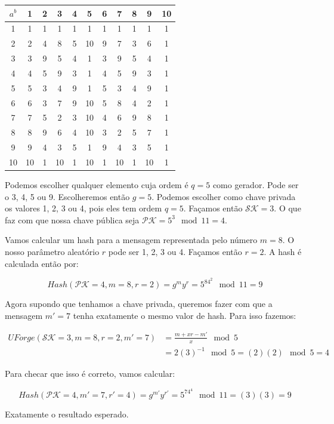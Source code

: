 \documentclass[a4paper]{article}
\begin{document}
 \begin{tabular}{|c||c|c|c|c|c|c|c|c|c|c|}
 \hline
 $a^b$&1&2&3&4&5&6&7&8&9&10\\
 \hline
 \hline
 1&1&1&1&1&1&1&1&1&1&1\\
 \hline
 2&2&4&8&5&10&9&7&3&6&1\\
 \hline
 3&3&9&5&4&1&3&9&5&4&1\\
 \hline
 4&4&5&9&3&1&4&5&9&3&1\\
 \hline
 5&5&3&4&9&1&5&3&4&9&1\\
 \hline
 6&6&3&7&9&10&5&8&4&2&1\\
 \hline
 7&7&5&2&3&10&4&6&9&8&1\\
 \hline
 8&8&9&6&4&10&3&2&5&7&1\\
 \hline
 9&9&4&3&5&1&9&4&3&5&1\\
 \hline
 10&10&1&10&1&10&1&10&1&10&1\\
 \hline
 \end{tabular}
 
 Podemos escolher qualquer elemento cuja ordem é $q=5$ como
 gerador. Pode ser o 3, 4, 5 ou 9. Escolheremos então $g=5$. Podemos
 escolher como chave privada os valores 1, 2, 3 ou 4, pois eles tem
 ordem $q=5$. Façamos então $\mathcal{SK}=3$. O que faz com que nossa
 chave pública seja $\mathcal{PK}=5^3\mod 11 = 4$.
 
 Vamos calcular um hash para a mensagem representada pelo número
 $m=8$. O nosso parâmetro aleatório $r$ pode ser 1, 2, 3 ou 4. Façamos
 então $r=2$. A hash é calculada então por:
 
 $$
 Hash(\mathcal{PK}=4, m=8, r=2) = g^my^r = 5^84^2 \mod 11 = 9
 $$
 
 Agora supondo que tenhamos a chave privada, queremos fazer com que a
 mensagem $m'=7$ tenha exatamente o mesmo valor de hash. Para isso
 fazemos:
 
 \begin{equation}
 \begin{split}
 UForge(\mathcal{SK}=3, m=8, r=2, m'=7) &= \frac{m+xr-m'}{x} \mod 5\\
 &= 2(3)^{-1} \mod 5 = (2)(2) \mod 5 = 4
 \end{split}
 \end{equation}
 
 Para checar que isso é correto, vamos calcular:
 
 $$ Hash(\mathcal{PK}=4, m'=7, r'=4) = g^{m'}y^{r'} = 5^74^4 \mod 11 =
 (3)(3)= 9
 $$
 
 Exatamente o resultado esperado.
 
\end{document}
